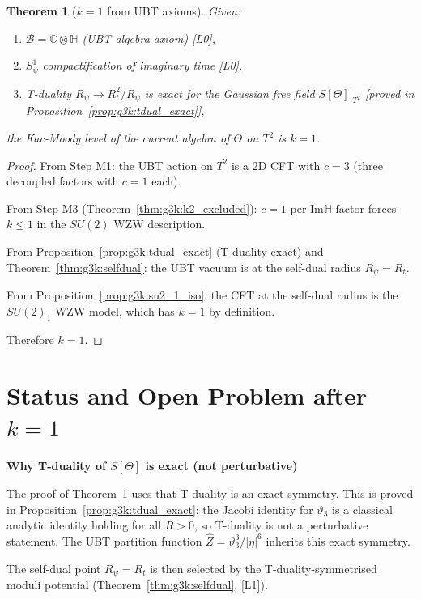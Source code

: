 \documentclass[12pt,a4paper]{article}
\newtheorem{theorem}{Theorem}[section]
\theoremstyle{definition}
\theoremstyle{remark}
\begin{document}
\begin{theorem}[$k = 1$ from UBT axioms]
\label{thm:g3k:k1}
Given:
\begin{enumerate}
  \item $\mathcal{B} = \mathbb{C}\otimes\mathbb{H}$ (UBT algebra axiom) \textup{[L0]},
  \item $S^1_\psi$ compactification of imaginary time \textup{[L0]},
  \item T-duality $R_\psi \to R_t^2/R_\psi$ is exact for the Gaussian free field
        $S[\Theta]|_{T^2}$ \textup{[proved in Proposition~\ref{prop:g3k:tdual_exact}]},
\end{enumerate}
the Kac-Moody level of the current algebra of $\Theta$ on $T^2$ is $k = 1$.
\end{theorem}

\begin{proof}
From Step M1: the UBT action on $T^2$ is a 2D CFT with $c = 3$ (three decoupled
factors with $c = 1$ each).

From Step M3 (Theorem~\ref{thm:g3k:k2_excluded}): $c = 1$ per Im$\mathbb{H}$ factor
forces $k \leq 1$ in the $SU(2)$ WZW description.

From Proposition~\ref{prop:g3k:tdual_exact} (T-duality exact) and
Theorem~\ref{thm:g3k:selfdual}: the UBT vacuum is at the self-dual radius $R_\psi = R_t$.

From Proposition~\ref{prop:g3k:su2_1_iso}: the CFT at the self-dual radius is the
$SU(2)_1$ WZW model, which has $k = 1$ by definition.

Therefore $k = 1$.
\end{proof}

\section{Status and Open Problem after $k = 1$}
\label{sec:g3k:condition_gap}

\begin{insightbox}
\textbf{Why T-duality of $S[\Theta]$ is exact (not perturbative)}

The proof of Theorem~\ref{thm:g3k:k1} uses that T-duality is an exact symmetry.
This is proved in Proposition~\ref{prop:g3k:tdual_exact}: the Jacobi identity
for $\vartheta_3$ is a classical analytic identity holding for all $R > 0$, so
T-duality is not a perturbative statement.  The UBT partition function
$\hat{Z} = \vartheta_3^3/|\eta|^6$ inherits this exact symmetry.

The self-dual point $R_\psi = R_t$ is then selected by the T-duality-symmetrised
moduli potential (Theorem~\ref{thm:g3k:selfdual}, [L1]).
\end{insightbox}
\end{document}
